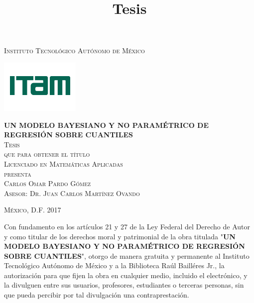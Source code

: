 \documentclass[letterpaper,onside,11pt,review,usenames,dvipsnames]{report}
\begin{document}
\pagestyle{empty} %

\title{Tesis} %

\begin{titlepage}
\begin{center}

\textsc{\Large Instituto Tecnol\'ogico Aut\'onomo de M\'exico}\\[2em]

\begin{center}
	\includegraphics{DocumentosLaTex/ITAM_2016}
\end{center}

\vspace{1em}

{\sc \large {\bf UN MODELO BAYESIANO Y NO PARAM\'ETRICO DE REGRESI\'ON SOBRE CUANTILES}}\\[3em]

\textsc{\large Tesis}\\[1em]

\textsc{que para obtener el t\'itulo}\\[1em]

\textsc{Licenciado en Matem\'aticas Aplicadas}\\[1em]

\textsc{presenta}\\[1em]

\textsc{\Large Carlos Omar Pardo G\'omez}\\[1em]

\textsc{\large Asesor: Dr. Juan Carlos Mart\'inez Ovando}

\end{center}

\vspace*{\fill}
\textsc{M\'exico, D.F. \hspace*{\fill} 2017}

\end{titlepage}


\thispagestyle{empty}
\vspace*{\fill}
\begingroup
Con fundamento en los art\'iculos 21 y 27 de la Ley Federal del Derecho de Autor y como titular de los derechos moral y patrimonial de la obra titulada "\textbf{UN MODELO BAYESIANO Y NO PARAM\'ETRICO DE REGRESI\'ON SOBRE CUANTILES}", otorgo de manera gratuita y permanente al Instituto Tecnol\'ogico Aut\'onomo de M\'exico y a la Biblioteca Ra\'ul Baill\'eres Jr., la autorizaci\'on para que fijen la obra en cualquier medio, incluido el electr\'onico, y la divulguen entre sus usuarios, profesores, estudiantes o terceras personas, sin que pueda percibir por tal divulgaci\'on una contraprestaci\'on.
\end{document}
